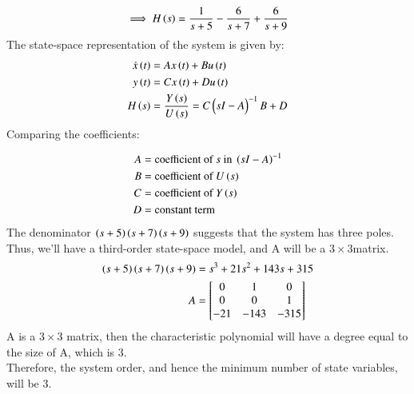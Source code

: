 \documentclass[a4,12pt,onecolumn]{IEEEtran}
\newcommand{\mybmat}[1]{\ensuremath{\begin{bmatrix}#1\end{bmatrix}}}
\begin{document}
\begin{align}
\implies H\left(s\right)&=\frac{1}{s+5} -\frac{6}{s+7} + \frac{6}{s+9}\\
\end{align}
The state-space representation of the system is given by:
\begin{align}
\dot{x}\left(t\right) &= Ax\left(t\right) + Bu\left(t\right) \\
y\left(t\right) &= Cx\left(t\right) + Du\left(t\right)\\
H\left(s\right)&=\frac{Y\left(s\right)}{U\left(s\right)}=C\begin{pmatrix}sI-A\end{pmatrix}^{-1}B + D  
\end{align}
Comparing the coefficients:

\begin{align}
A &= \text{coefficient of } s \text{ in } \left(sI-A\right)^{-1} \\
B &= \text{coefficient of }  U\left(s\right)\\
C &= \text{coefficient of } Y\left(s\right) \\
D &= \text{constant term}
\end{align}
 The denominator $\left(s+5\right)\left(s+7\right)\left(s+9\right)$ suggests that the system has three poles. Thus, we'll have a third-order state-space model, and A will be a $3\times 3$matrix.
\begin{align}
\brak{s+5}\brak{s+7}\brak{s+9} &=s^3+21s^2+143s+315\\
A &=  \mybmat{0 & 1&0 \\ 0 & 0&1\\-21&-143&-315}\\
\end{align}
A is a $ 3\times 3$ matrix, then the characteristic polynomial will have a degree equal to the size of A, which is $3$.\\
Therefore, the system order, and hence the minimum number of state variables, will be 3.\\
\end{document}
